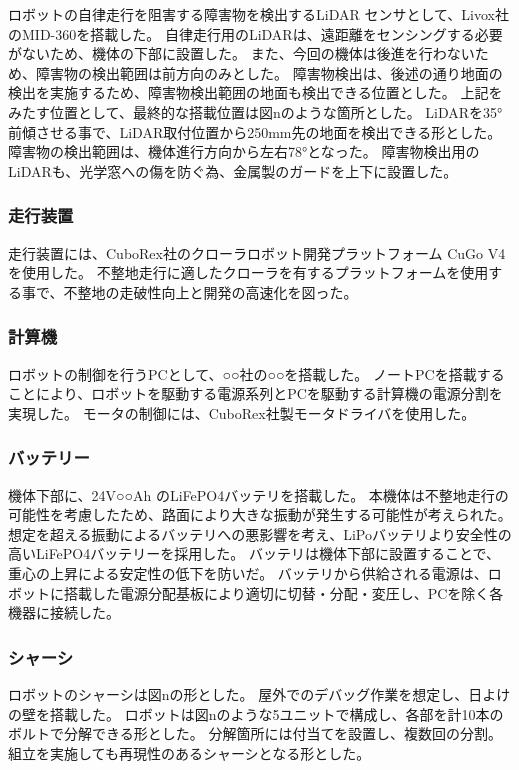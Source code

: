 ロボットの自律走行を阻害する障害物を検出するLiDAR センサとして、Livox社のMID-360を搭載した。
自律走行用のLiDARは、遠距離をセンシングする必要がないため、機体の下部に設置した。
また、今回の機体は後進を行わないため、障害物の検出範囲は前方向のみとした。
障害物検出は、後述の通り地面の検出を実施するため、障害物検出範囲の地面も検出できる位置とした。
上記をみたす位置として、最終的な搭載位置は図nのような箇所とした。
LiDARを35°前傾させる事で、LiDAR取付位置から250mm先の地面を検出できる形とした。
障害物の検出範囲は、機体進行方向から左右78°となった。
障害物検出用のLiDARも、光学窓への傷を防ぐ為、金属製のガードを上下に設置した。

\subsubsection{走行装置}
走行装置には、CuboRex社のクローラロボット開発プラットフォーム CuGo V4を使用した。
不整地走行に適したクローラを有するプラットフォームを使用する事で、不整地の走破性向上と開発の高速化を図った。

\subsubsection{計算機}
ロボットの制御を行うPCとして、○○社の○○を搭載した。
ノートPCを搭載することにより、ロボットを駆動する電源系列とPCを駆動する計算機の電源分割を実現した。
モータの制御には、CuboRex社製モータドライバを使用した。

\subsubsection{バッテリー}
機体下部に、24V○○Ah のLiFePO4バッテリを搭載した。
本機体は不整地走行の可能性を考慮したため、路面により大きな振動が発生する可能性が考えられた。
想定を超える振動によるバッテリへの悪影響を考え、LiPoバッテリより安全性の高いLiFePO4バッテリーを採用した。
バッテリは機体下部に設置することで、重心の上昇による安定性の低下を防いだ。
バッテリから供給される電源は、ロボットに搭載した電源分配基板により適切に切替・分配・変圧し、PCを除く各機器に接続した。

\subsubsection{シャーシ}
ロボットのシャーシは図nの形とした。
屋外でのデバッグ作業を想定し、日よけの壁を搭載した。
ロボットは図nのような5ユニットで構成し、各部を計10本のボルトで分解できる形とした。
分解箇所には付当てを設置し、複数回の分割。組立を実施しても再現性のあるシャーシとなる形とした。

